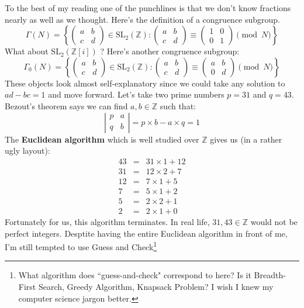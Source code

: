 \documentclass[12pt]{article}
\begin{document}
\noindent To the best of my reading one of the punchlines is that we don't know fractions nearly as well as we thought.  Here's the definition of a congruence subgroup.
$$ \Gamma(N) = \left\{ \left( \begin{array}{cc} a & b \\ c & d\end{array} \right)\in \text{SL}_2(\mathbb{Z}): 
\left( \begin{array}{cc} a & b \\ c & d \end{array} \right)  \equiv 
\left( \begin{array}{cc} 1 & 0 \\ 0 & 1 \end{array} \right) \pmod N \right\} $$
What about $\text{SL}_2(\mathbb{Z}[i])$ ? Here's another congruence subgroup:
$$ \Gamma_0(N) =
\left\{ \left( \begin{array}{cc} a & b \\ c & d\end{array} \right)\in \text{SL}_2(\mathbb{Z}): 
\left( \begin{array}{cc} a & b \\ c & d \end{array} \right)  \equiv 
\left( \begin{array}{cc} a & b \\ 0 & d \end{array} \right) \pmod N \right\} $$
These objects look almost self-explanatory since we could take any solution to $ad-bc=1$ and move forward. \newpage
\noindent Let's take two prime numbers $p = 31$ and $q = 43$.   Bezout's theorem says we can find $a,b \in \mathbb{Z}$ such that:
$$ \left| \begin{array}{cc} p & a \\ q & b \end{array} \right| = p \times b - a \times q = 1$$
The \textbf{Euclidean algorithm} which is well studied over $\mathbb{Z}$ gives us (in a rather ugly layout):
\begin{eqnarray*}
43 &=& 31 \times 1 + 12 \\ 
31 &=& 12 \times 2 + 7  \\
12 &=&  7 \times 1 + 5  \\
7  &=&  5 \times 1 + 2  \\
5  &=&  2 \times 2 + 1  \\
2  &=&  2 \times 1 + 0
\end{eqnarray*}
Fortunately for us, this algorithm terminates.  In real life, $31, 43 \in \mathbb{Z}$ would not be perfect integers.  Desptite having the entire Euclidean algorithm in front of me, I'm still tempted to use Guess and Check\footnote{What algorithm does ``guess-and-check" correspond to here?  Is it Breadth-First Search, Greedy Algorithm, Knapsack Problem?  I wish I knew my computer science jargon better.}
\end{document}

